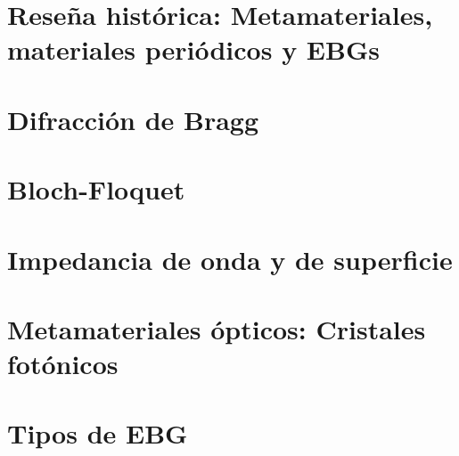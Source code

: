 
\section{Reseña histórica: Metamateriales, materiales periódicos y EBGs}
\label{sec_reseña_metamateriales}
\section{Difracción de Bragg}
\label{sec_bragg}
\section{Bloch-Floquet}
\label{sec_bloch}
\section{Impedancia de onda y de superficie}
\label{sec_imp_superficie}



\section{Metamateriales ópticos: Cristales fotónicos}
\label{sec_cristales_fotonicos}
\section{Tipos de EBG}
\label{sec_tipos_mtm}

